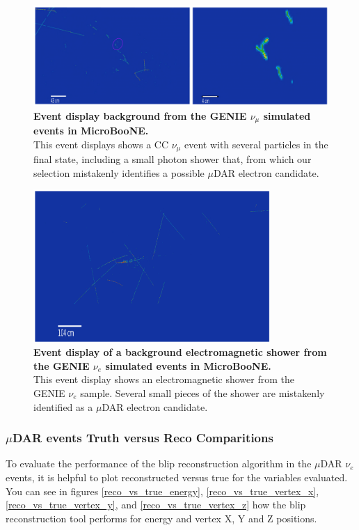 \begin{figure}[h!]
    \centering
    \includegraphics[width=120mm]{Figures/numu_evd.jpeg}
    \caption[Event display of a background from the GENIE $\nu_{\mu}$ simulated event in MicroBooNE.]{{\textbf{Event display background from the GENIE $\nu_{\mu}$ simulated events in MicroBooNE.}}\\ This event displays shows a CC $\nu_{\mu}$ event with several particles in the final state, including a small photon shower that, from which our selection mistakenly identifies a possible $\mu$DAR electron candidate.}
    \label{bkg_evd_2}
\end{figure}

\begin{figure}[h!]
    \centering
    \includegraphics[width=90mm]{Figures/shower_evd_2.png}
    \caption[Event display of a background electromagnetic shower from the GENIE $\nu_{e}$ simulated events in MicroBooNE.]{{\textbf{Event display of a background electromagnetic shower from the GENIE $\nu_{e}$ simulated events in MicroBooNE.}}\\ This event display shows an electromagnetic shower from the GENIE $\nu_{e}$ sample. Several small pieces of the shower are mistakenly identified as a $\mu$DAR electron candidate.}
    \label{bkg_evd_3}
\end{figure}


\newpage
\subsubsection{$\mu$DAR events Truth versus Reco Comparitions}
To evaluate the performance of the blip reconstruction algorithm in the $\mu$DAR $\nu_e$ events, it is helpful to plot reconstructed versus true for the variables evaluated. You can see in figures \ref{reco_vs_true_energy}, \ref{reco_vs_true_vertex_x}, \ref{reco_vs_true_vertex_y}, and \ref{reco_vs_true_vertex_z} how the blip reconstruction tool performs for energy and vertex X, Y and Z positions. 

